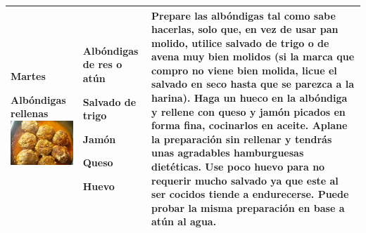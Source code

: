 \documentclass[menu.tex]{subfiles}
\begin{document}
\begin{tabular} {p{3.5cm} p{4cm} p{9cm}}
        \pbox{20cm}
        {
            \rule{0pt}{3ex}\begin{large}\textbf{Martes}\end{large}\\
            \rule{0pt}{2ex}Albóndigas rellenas\\
            \includegraphics[scale=0.0092]{albondigas-rellenas}
        }&
        \vspace{-1.6cm}
        \begin{compactitem} 
            \begin{footnotesize}
                \item Albóndigas de res o atún
                \item Salvado de trigo
                \item Jamón
                \item Queso
                \item Huevo
            \end{footnotesize}
        \end{compactitem}&
        \vspace{-1.6cm}
        Prepare las albóndigas tal como sabe hacerlas, solo que, en vez de usar pan molido, utilice salvado de trigo o de avena muy bien molidos (si la marca que compro no viene bien molida, licue el salvado en seco hasta que se parezca a la harina). Haga un hueco en la albóndiga y rellene con queso y jamón picados en forma fina, cocinarlos en aceite. Aplane la preparación sin rellenar y tendrás unas agradables hamburguesas dietéticas. Use poco huevo para no requerir mucho salvado ya que este al ser cocidos tiende a endurecerse. Puede probar la misma preparación en base a atún al agua.\\
        \hline
        

\end{tabular}
\end{document}

